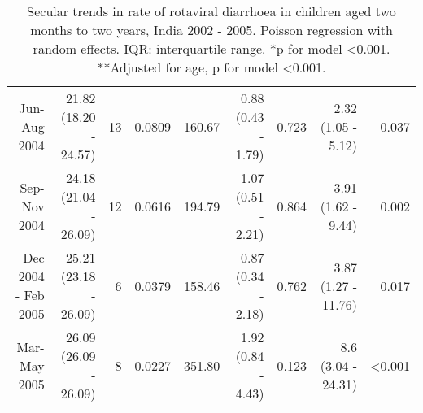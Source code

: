 \documentclass[11pt,a4paper]{article}\usepackage{graphicx, color}
\begin{document}
\begin{sidewaystable}[p]
\begin{center}
\begin{tabular}{rrrrrrrrr}
Jun-Aug 2004 & 21.82 (18.20 - 24.57) & 13 & 0.0809 & 160.67 & 0.88 (0.43 - 1.79) & 0.723 & 2.32 (1.05 - 5.12) & 0.037 \\ 
Sep-Nov 2004 & 24.18 (21.04 - 26.09) & 12 & 0.0616 & 194.79 & 1.07 (0.51 - 2.21) & 0.864 & 3.91 (1.62 - 9.44) & 0.002 \\ 
Dec 2004 - Feb 2005 & 25.21 (23.18 - 26.09) & 6 & 0.0379 & 158.46 & 0.87 (0.34 - 2.18) & 0.762 & 3.87 (1.27 - 11.76) & 0.017 \\ 
Mar-May 2005 & 26.09 (26.09 - 26.09) & 8 & 0.0227 & 351.80 & 1.92 (0.84 - 4.43) & 0.123 & 8.6 (3.04 - 24.31) & \multicolumn{1}{c}{\textless0.001} \\ 
\bottomrule
\end{tabular}
\end{center}
\caption{Secular trends in rate of rotaviral diarrhoea in children aged two months to two years, India 2002 - 2005. Poisson regression with random effects. IQR: interquartile range. *p for model \textless0.001. **Adjusted for age, p for model \textless 0.001.}
\label{trend}
\end{sidewaystable}
\end{document}

